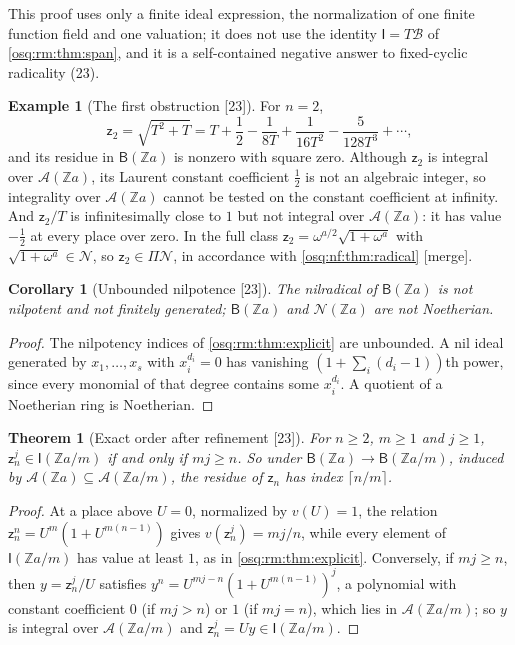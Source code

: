 \documentclass[11pt,letterpaper]{article}
\numberwithin{equation}{section}
\newtheorem{theorem}{Theorem}[section]
\newtheorem{corollary}[corollary]{Corollary}
\theoremstyle{definition}
\newtheorem{example}[example]{Example}
\theoremstyle{remark}
\theoremstyle{plain}
\newcommand{\Z}{\mathbb Z}
\newcommand{\A}{\mathcal A}          %
\newcommand{\NN}{\mathcal N}         %
\newcommand{\src}[1]{\textup{\textsf{[#1]}}}
\newcommand{\merge}{\textup{\textsf{[merge]}}}
\begin{document}
This proof uses only a finite ideal expression, the normalization of one finite function field and one valuation; it does not use the identity
$\mathsf I=T\mathscr B$ of \cref{osq:rm:thm:span}, and it is a self-contained negative answer to fixed-cyclic radicality (23).

\begin{example}[The first obstruction \src{23}]\label{osq:rm:ex:sqrt}
For $n=2$,
\[
 \mathsf z_2=\sqrt{T^2+T}=T+\frac12-\frac1{8T}+\frac1{16T^2}-\frac5{128T^3}+\cdots,
\]
and its residue in $\mathsf B(\Z a)$ is nonzero with square zero. Although $\mathsf z_2$ is integral over $\A(\Z a)$, its Laurent constant coefficient
$\frac12$ is not an algebraic integer, so integrality over $\A(\Z a)$ cannot be tested on the constant coefficient at infinity. And $\mathsf z_2/T$ is
infinitesimally close to $1$ but not integral over $\A(\Z a)$: it has value $-\frac12$ at every place over zero. In the full class
$\mathsf z_2=\omega^{a/2}\sqrt{1+\omega^a}$ with $\sqrt{1+\omega^a}\in\NN$, so $\mathsf z_2\in\Pi\NN$, in accordance with \cref{osq:nf:thm:radical}
\merge.
\end{example}

\begin{corollary}[Unbounded nilpotence \src{23}]\label{osq:rm:cor:unbounded}
The nilradical of $\mathsf B(\Z a)$ is not nilpotent and not finitely generated; $\mathsf B(\Z a)$ and $\NN(\Z a)$ are not Noetherian.
\end{corollary}
\begin{proof}
The nilpotency indices of \cref{osq:rm:thm:explicit} are unbounded. A nil ideal generated by $x_1,\dots,x_s$ with $x_i^{d_i}=0$ has vanishing
$(1+\sum_i(d_i-1))$th power, since every monomial of that degree contains some $x_i^{d_i}$. A quotient of a Noetherian ring is Noetherian.
\end{proof}

\begin{theorem}[Exact order after refinement \src{23}]\label{osq:rm:thm:explicitrefinement}
For $n\ge2$, $m\ge1$ and $j\ge1$, $\mathsf z_n^j\in\mathsf I(\Z a/m)$ if and only if $mj\ge n$. So under $\mathsf B(\Z a)\to\mathsf B(\Z a/m)$, induced by
$\A(\Z a)\subseteq\A(\Z a/m)$, the residue of $\mathsf z_n$ has index $\lceil n/m\rceil$.
\end{theorem}
\begin{proof}
At a place above $U=0$, normalized by $v(U)=1$, the relation $\mathsf z_n^n=U^m(1+U^{m(n-1)})$ gives $v(\mathsf z_n^j)=mj/n$, while every element of
$\mathsf I(\Z a/m)$ has value at least $1$, as in \cref{osq:rm:thm:explicit}. Conversely, if $mj\ge n$, then $y=\mathsf z_n^j/U$ satisfies
$y^n=U^{mj-n}(1+U^{m(n-1)})^j$, a polynomial with constant coefficient $0$ (if $mj>n$) or $1$ (if $mj=n$), which lies in $\A(\Z a/m)$; so $y$ is integral
over $\A(\Z a/m)$ and $\mathsf z_n^j=Uy\in\mathsf I(\Z a/m)$.
\end{proof}
\end{document}
